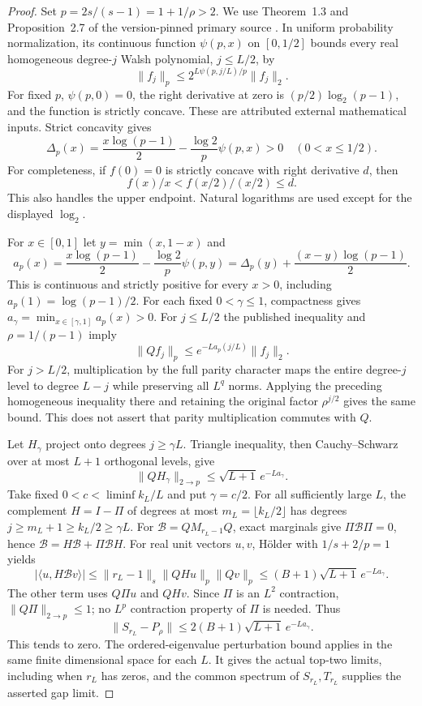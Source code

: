 \documentclass[11pt]{article}
\begin{document}
\begin{proof}
Set $p=2s/(s-1)=1+1/\rho>2$. We use Theorem~1.3 and
Proposition~2.7 of the version-pinned primary source
\cite{kirshner-samorodnitsky}. In uniform probability normalization, its
continuous function $\psi(p,x)$ on $[0,1/2]$ bounds every real homogeneous
degree-$j$ Walsh polynomial, $j\leq L/2$, by
\[
 \|f_j\|_p\leq2^{L\psi(p,j/L)/p}\|f_j\|_2.
\]
For fixed $p$, $\psi(p,0)=0$, the right derivative at zero is
$(p/2)\log_2(p-1)$, and the function is strictly concave.
These are attributed external mathematical inputs. Strict concavity gives
\[
 \Delta_p(x)=\frac{x\log(p-1)}2-
 \frac{\log2}{p}\psi(p,x)>0\quad(0<x\leq1/2).
\]
For completeness, if $f(0)=0$ is strictly concave with right derivative $d$, then
\[
 f(x)/x<f(x/2)/(x/2)\leq d.
\]
This also handles the upper endpoint. Natural logarithms are used except for
the displayed $\log_2$.

For $x\in[0,1]$ let $y=\min(x,1-x)$ and
\[
 a_p(x)=\frac{x\log(p-1)}2-\frac{\log2}{p}\psi(p,y)
 =\Delta_p(y)+\frac{(x-y)\log(p-1)}2.
\]
This is continuous and strictly positive for every $x>0$, including
$a_p(1)=\log(p-1)/2$. For each fixed $0<\gamma\leq1$, compactness gives
$a_\gamma=\min_{x\in[\gamma,1]}a_p(x)>0$.
For $j\leq L/2$ the published inequality and $\rho=1/(p-1)$ imply
\[
 \|Qf_j\|_p\leq e^{-La_p(j/L)}\|f_j\|_2.
\]
For $j>L/2$, multiplication by the full parity character maps the entire
degree-$j$ level to degree $L-j$ while preserving all $L^q$ norms.
Applying the preceding homogeneous inequality there and retaining the
original factor $\rho^{j/2}$ gives the same bound. This does not assert
that parity multiplication commutes with $Q$.

Let $H_\gamma$ project onto degrees $j\geq\gamma L$. Triangle inequality,
then Cauchy--Schwarz over at most $L+1$ orthogonal levels, give
\begin{equation}\label{eq:high-level-endpoint-322}
 \|QH_\gamma\|_{2\to p}\leq\sqrt{L+1}\,e^{-La_\gamma}.
\end{equation}
Take fixed $0<c<\liminf k_L/L$ and put $\gamma=c/2$. For all sufficiently
large $L$, the complement $H=I-\Pi$ of degrees at most
$m_L=\lfloor k_L/2\rfloor$ has degrees
$j\geq m_L+1\geq k_L/2\geq\gamma L$.
For $\mathcal B=QM_{r_L-1}Q$, exact marginals give $\Pi\mathcal B\Pi=0$,
hence $\mathcal B=H\mathcal B+\Pi\mathcal BH$.
For real unit vectors $u,v$, H\"older with $1/s+2/p=1$ yields
\[
 |\langle u,H\mathcal Bv\rangle|
 \leq\|r_L-1\|_s\|QHu\|_p\|Qv\|_p
 \leq(B+1)\sqrt{L+1}\,e^{-La_\gamma}.
\]
The other term uses $Q\Pi u$ and $QHv$. Since $\Pi$ is an $L^2$
contraction, $\|Q\Pi\|_{2\to p}\leq1$; no $L^p$ contraction property
of $\Pi$ is needed. Thus
\[
 \|S_{r_L}-P_\rho\|\leq2(B+1)\sqrt{L+1}\,e^{-La_\gamma}.
\]
This tends to zero. The ordered-eigenvalue perturbation bound applies in
the same finite dimensional space for each $L$. It gives the actual
top-two limits, including when $r_L$ has zeros, and the common spectrum
of $S_{r_L},T_{r_L}$ supplies the asserted gap limit.
\end{proof}
\end{document}
